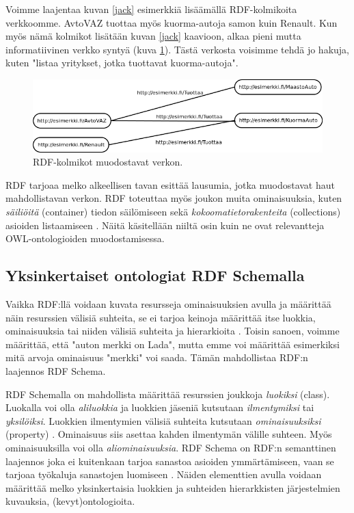 \documentclass[finnish]{tktltiki2}
\theoremstyle{definition}
\theoremstyle{remark}
\begin{document}
Voimme laajentaa kuvan \ref{jack} esimerkkiä lisäämällä RDF-kolmikoita verkkoomme. AvtoVAZ tuottaa myös kuorma-autoja samon kuin Renault.
Kun myös nämä kolmikot lisätään kuvan \ref{jack} kaavioon, alkaa
pieni mutta informatiivinen verkko syntyä (kuva \ref{jack2}). Tästä verkosta voisimme
tehdä jo hakuja, kuten "listaa yritykset, jotka tuottavat kuorma-autoja".

\begin{figure}[h]
 \centering
 \includegraphics[scale=0.50]{torrance2.png}
 \caption{RDF-kolmikot muodostavat verkon.}
 \label{jack2}
\end{figure}

RDF tarjoaa melko alkeellisen tavan esittää lausumia, jotka
muodostavat haut mahdollistavan verkon. RDF toteuttaa myös joukon muita ominaisuuksia, kuten
\textit{säiliöitä} (container) tiedon säilömiseen sekä
\textit{kokoomatietorakenteita}
(collections) asioiden listaamiseen \cite{RDFP}. Näitä käsitellään
niiltä osin 
kuin ne ovat relevantteja OWL-ontologioiden muodostamisessa.  
 
\subsection{Yksinkertaiset ontologiat RDF Schemalla}

Vaikka RDF:llä voidaan kuvata resursseja ominaisuuksien avulla ja määrittää näin resurssien välisiä suhteita, se ei tarjoa keinoja määrittää itse luokkia, ominaisuuksia tai
niiden välisiä suhteita ja hierarkioita \cite{RDFS}. Toisin sanoen, voimme määrittää, että "auton merkki on Lada", mutta emme voi määrittää esimerkiksi mitä arvoja ominaisuus "merkki" voi saada.
Tämän mahdollistaa RDF:n laajennos RDF Schema. 

RDF Schemalla on mahdollista määrittää resurssien joukkoja \textit{luokiksi} (class).  Luokalla voi olla  \textit{aliluokkia} ja luokkien jäseniä kutsutaan \textit{ilmentymiksi} tai \textit{yksilöiksi}. Luokkien ilmentymien välisiä suhteita kutsutaan \textit{ominaisuuksiksi} (property) \cite{RDFS}. Ominaisuus siis asettaa kahden ilmentymän välille suhteen. Myös ominaisuuksilla voi olla \textit{aliominaisuuksia}.
RDF Schema on RDF:n semanttinen laajennos joka ei kuitenkaan tarjoa sanastoa asioiden ymmärtämiseen, vaan se tarjoaa työkaluja sanastojen luomiseen \cite{RDFS}. Näiden elementtien avulla voidaan määrittää melko yksinkertaisia luokkien ja suhteiden hierarkkisten järjestelmien kuvauksia, (kevyt)ontologioita.  
\end{document}
